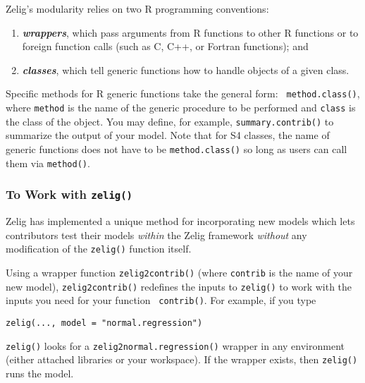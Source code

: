 Zelig's modularity relies on two R programming conventions:
\begin{enumerate}
\item \emph{\bf wrappers}, which pass arguments from R functions to
  other R functions or to foreign function calls (such as C, C++, or
  Fortran functions); and 
\item \emph{\bf classes}, which tell generic functions how to handle
  objects of a given class.  
\end{enumerate}
Specific methods for R generic functions take the general form: {\tt
  method.class()}, where {\tt method} is the name of the generic
procedure to be performed and {\tt class} is the class of the object.
You may define, for example, {\tt summary.contrib()} to summarize the
output of your model. Note that for S4 classes, the name of generic
functions does not have to be {\tt method.class()} so long as users
can call them via {\tt method()}.

\subsubsection{To Work with {\tt zelig()}}

Zelig has implemented a unique method for incorporating new models
which lets contributors test their models \emph{within} the Zelig
framework \emph{without} any modification of the {\tt zelig()}
function itself.  

Using a wrapper function {\tt zelig2contrib()} (where {\tt contrib} is
the name of your new model), {\tt zelig2contrib()} redefines the inputs to
{\tt zelig()} to work with the inputs you need for your function {\tt
contrib()}.  For example, if you type
\begin{verbatim}
zelig(..., model = "normal.regression")
\end{verbatim}
{\tt zelig()} looks for a {\tt zelig2normal.regression()} wrapper in any
environment (either attached libraries or your workspace).  If the
wrapper exists, then {\tt zelig()} runs the model.  

